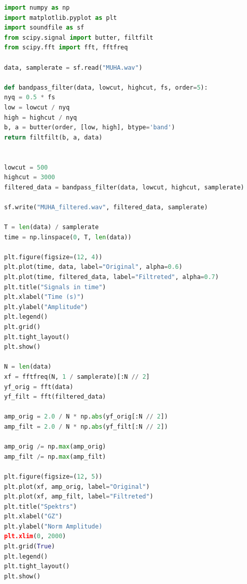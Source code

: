 \documentclass[a4paper,12pt]{article}
\begin{document}
\begin{lstlisting}[language=python,caption={Задание 2. Фильтрация сигнала}]
import numpy as np
import matplotlib.pyplot as plt
import soundfile as sf
from scipy.signal import butter, filtfilt
from scipy.fft import fft, fftfreq

data, samplerate = sf.read("MUHA.wav")

def bandpass_filter(data, lowcut, highcut, fs, order=5):
nyq = 0.5 * fs
low = lowcut / nyq
high = highcut / nyq
b, a = butter(order, [low, high], btype='band')
return filtfilt(b, a, data)


lowcut = 500
highcut = 3000
filtered_data = bandpass_filter(data, lowcut, highcut, samplerate)

sf.write("MUHA_filtered.wav", filtered_data, samplerate)

T = len(data) / samplerate
time = np.linspace(0, T, len(data))

plt.figure(figsize=(12, 4))
plt.plot(time, data, label="Original", alpha=0.6)
plt.plot(time, filtered_data, label="Filtreted", alpha=0.7)
plt.title("Signals in time")
plt.xlabel("Time (s)")
plt.ylabel("Amplitude")
plt.legend()
plt.grid()
plt.tight_layout()
plt.show()

N = len(data)
xf = fftfreq(N, 1 / samplerate)[:N // 2]
yf_orig = fft(data)
yf_filt = fft(filtered_data)

amp_orig = 2.0 / N * np.abs(yf_orig[:N // 2])
amp_filt = 2.0 / N * np.abs(yf_filt[:N // 2])

amp_orig /= np.max(amp_orig)
amp_filt /= np.max(amp_filt)

plt.figure(figsize=(12, 5))
plt.plot(xf, amp_orig, label="Original")
plt.plot(xf, amp_filt, label="Filtreted")
plt.title("Spektrs")
plt.xlabel("GZ")
plt.ylabel("Norm Amplitude)
plt.xlim(0, 2000)
plt.grid(True)
plt.legend()
plt.tight_layout()
plt.show()

\end{lstlisting}
\end{document}
